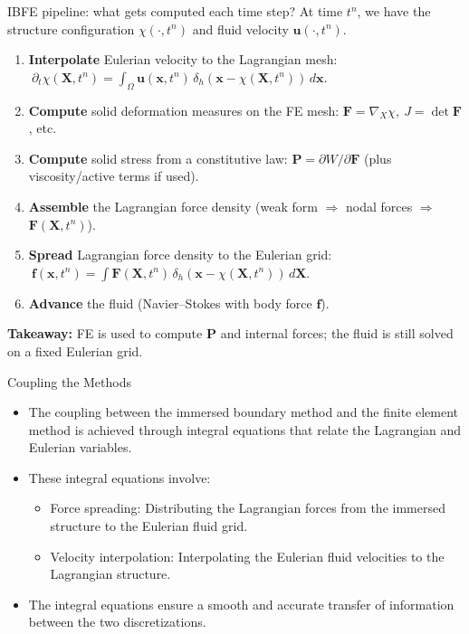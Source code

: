 \documentclass{beamer}
\begin{document}
\begin{frame}{IBFE pipeline: what gets computed each time step?}
\small
At time \(t^n\), we have the structure configuration \(\chi(\cdot,t^n)\) and fluid velocity \(\bm{u}(\cdot,t^n)\).

\medskip
\begin{enumerate}
  \item \textbf{Interpolate} Eulerian velocity to the Lagrangian mesh:
  \(\ \partial_t\chi(\bm{X},t^n) = \int_{\Omega} \bm{u}(\bm{x},t^n)\,\delta_h(\bm{x}-\chi(\bm{X},t^n))\,d\bm{x}\).
  \item \textbf{Compute} solid deformation measures on the FE mesh:
  \(\bm{F}=\nabla_X\chi,\ J=\det\bm{F}\), etc.
  \item \textbf{Compute} solid stress from a constitutive law:
  \(\bm{P}=\partial W/\partial \bm{F}\) (plus viscosity/active terms if used).
  \item \textbf{Assemble} the Lagrangian force density (weak form \(\Rightarrow\) nodal forces \(\Rightarrow\) \(\bm{F}(\bm{X},t^n)\)).
  \item \textbf{Spread} Lagrangian force density to the Eulerian grid:
  \(\ \bm{f}(\bm{x},t^n)=\int \bm{F}(\bm{X},t^n)\,\delta_h(\bm{x}-\chi(\bm{X},t^n))\,d\bm{X}\).
  \item \textbf{Advance} the fluid (Navier--Stokes with body force \(\bm{f}\)).
\end{enumerate}

\medskip
\textbf{Takeaway:} FE is used to compute \(\bm{P}\) and internal forces; the fluid is still solved on a fixed Eulerian grid.
\end{frame}


\begin{frame}{Coupling the Methods}
    \begin{itemize}
        \item The coupling between the immersed boundary method and the finite element method is achieved through integral equations that relate the Lagrangian and Eulerian variables.
        \item These integral equations involve:
        \begin{itemize}
            \item Force spreading: Distributing the Lagrangian forces from the immersed structure to the Eulerian fluid grid.
            \item Velocity interpolation: Interpolating the Eulerian fluid velocities to the Lagrangian structure.
        \end{itemize}
        \item The integral equations ensure a smooth and accurate transfer of information between the two discretizations.
    \end{itemize}
\end{frame}
\end{document}
